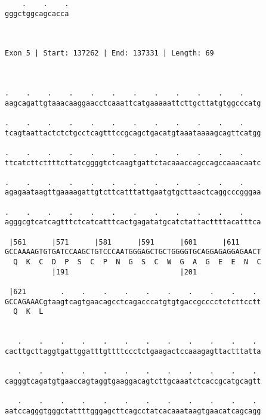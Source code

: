 \documentclass{article}
\begin{document}
\begin{Verbatim}
    .    .    .
gggctggcagcacca
               
               
 
Exon 5 | Start: 137262 | End: 137331 | Length: 69



.    .    .    .    .    .    .    .    .    .    .    .    
aagcagattgtaaacaaggaacctcaaattcatgaaaaattcttgcttatgtggcccatg
                                                            
.    .    .    .    .    .    .    .    .    .    .    .    
tcagtaattactctctgcctcagtttccgcagctgacatgtaaataaaagcagttcatgg
                                                            
.    .    .    .    .    .    .    .    .    .    .    .    
ttcatcttcttttcttatcggggtctcaagtgattctacaaaccagccagccaaacaatc
                                                            
.    .    .    .    .    .    .    .    .    .    .    .    
agagaataagttgaaaagattgtcttcatttattgaatgtgcttaactcaggcccgggaa
                                                            
.    .    .    .    .    .    .    .    .    .    .    .    
agggcgtcatcagtttctcatcatttcactgagatatgcatctattacttttacatttca
                                                            
 |561      |571      |581      |591      |601      |611     
GCCAAAAGTGTGATCCAAGCTGTCCCAATGGGAGCTGCTGGGGTGCAGGAGAGGAGAACT
  Q  K  C  D  P  S  C  P  N  G  S  C  W  G  A  G  E  E  N  C
           |191                          |201               
  
 |621        .    .    .    .    .    .    .    .    .    . 
GCCAGAAACgtaagtcagtgaacagcctcagacccatgtgtgaccgcccctctcttcctt
  Q  K  L                                                   
                                                            
  
   .    .    .    .    .    .    .    .    .    .    .    . 
cacttgcttaggtgattggatttgttttccctctgaagactccaaagagttactttatta
                                                            
   .    .    .    .    .    .    .    .    .    .    .    . 
cagggtcagatgtgaaccagtaggtgaaggacagtcttgcaaatctcaccgcatgcagtt
                                                            
   .    .    .    .    .    .    .    .    .    .    .    . 
aatccagggtgggctattttgggagcttcagcctatcacaaataagtgaacatcagcagg
                                                            

\end{Verbatim}
\end{document}
